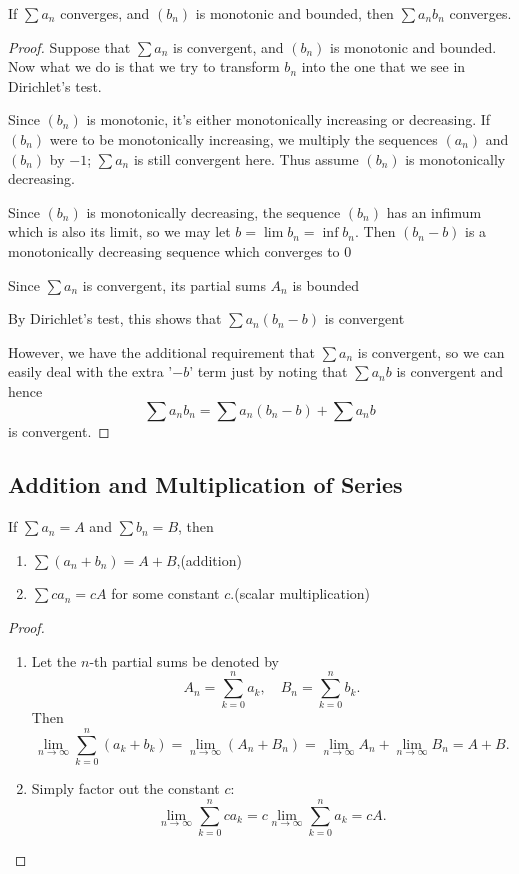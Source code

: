 \begin{lemma}
If $\sum a_n$ converges, and $(b_n)$ is monotonic and bounded, then $\sum a_n b_n$ converges.
\end{lemma}

\begin{proof}
Suppose that $\sum a_n$ is convergent, and $(b_n)$ is monotonic and bounded.
Now what we do is that we try to transform $b_n$ into the one that we see in Dirichlet's test.

Since $(b_n)$ is monotonic, it's either monotonically increasing or decreasing. 
If $(b_n)$ were to be monotonically increasing, we multiply the sequences $(a_n)$ and $(b_n)$ by $-1$; $\sum a_n$ is still convergent here.
Thus assume $(b_n)$ is monotonically decreasing.

Since $(b_n)$ is monotonically decreasing, the sequence $(b_n)$ has an infimum which is also its limit, so we may let $b=\lim b_n=\inf b_n$.
Then $(b_n-b)$ is a monotonically decreasing sequence which converges to $0$

Since $\sum a_n$ is convergent, its partial sums $A_n$ is bounded

By Dirichlet's test, this shows that $\sum a_n(b_n-b)$ is convergent

However, we have the additional requirement that $\sum a_n$ is convergent, so we can easily deal with the extra '$-b$' term just by noting that $\sum a_n b$ is convergent and hence
\[\sum a_n b_n=\sum a_n(b_n-b)+\sum a_n b\]
is convergent.
\end{proof}
\pagebreak

\subsection{Addition and Multiplication of Series}
\begin{lemma}
If $\sum a_n=A$ and $\sum b_n=B$, then
\begin{enumerate}[label=(\roman*)]
\item $\sum(a_n+b_n)=A+B$,\hfill(addition)
\item $\sum ca_n=cA$ for some constant $c$.\hfill(scalar multiplication)
\end{enumerate}
\end{lemma}

\begin{proof} \
\begin{enumerate}[label=(\roman*)]
\item Let the $n$-th partial sums be denoted by
\[A_n=\sum_{k=0}^{n}a_k,\quad B_n=\sum_{k=0}^{n}b_k.\]
Then
\[\lim_{n\to\infty}\sum_{k=0}^{n}(a_k+b_k)=\lim_{n\to\infty}(A_n+B_n)=\lim_{n\to\infty}A_n+\lim_{n\to\infty}B_n=A+B.\]
\item Simply factor out the constant $c$:
\[\lim_{n\to\infty}\sum_{k=0}^{n}ca_k=c\lim_{n\to\infty}\sum_{k=0}^{n}a_k=cA.\]
\end{enumerate}
\end{proof}

